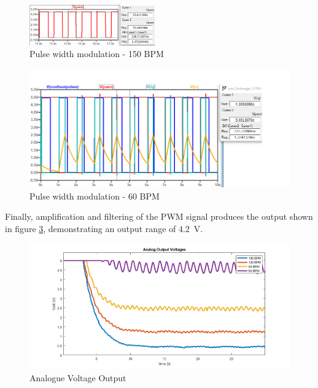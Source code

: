 \begin{figure}
    \centering
    \includegraphics[width = 0.48\textwidth]{./Figures/curses}
    \caption{Pulse width modulation - 150 BPM}
    \label{fig:curses}
\end{figure}

\begin{figure}
\centering
\includegraphics[width=\textwidth]{./Figures/pwm}
\caption{Pulse width modulation - 60 BPM}
\label{fig:pwm}
\end{figure}

Finally, amplification and filtering of the PWM signal produces the output shown in figure \ref{fig:analog}, demonstrating an output range of \SI{4.2}{V}. 

\begin{figure}
\centering
\includegraphics[width=\textwidth]{./Figures/analog}
\caption{Analogue Voltage Output}
\label{fig:analog}
\end{figure}
















